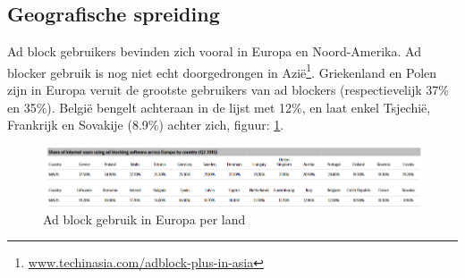 \documentclass[pdftex,a4paper,12pt,twoside]{report}
\begin{document}
\subsection{Geografische spreiding}
\label{sec Geografische spreiding}
Ad block gebruikers bevinden zich vooral in Europa en Noord-Amerika. Ad blocker gebruik is nog niet echt doorgedrongen in Azië\footnote{\url{www.techinasia.com/adblock-plus-in-asia}}.
Griekenland en Polen zijn in Europa veruit de grootste gebruikers van ad blockers (respectievelijk 37\% en 35\%). België bengelt achteraan in de lijst met 12\%, en laat enkel Tsjechië, Frankrijk en Sovakije (8.9\%) achter zich, figuur: \ref{fig: ratespercountry}.
\begin{figure}[h!]
\centering


\includegraphics[width=16cm]{img/ratespercountry}
\caption{Ad block gebruik in Europa per land}
\label{fig: ratespercountry}
\end{figure}
\end{document}
